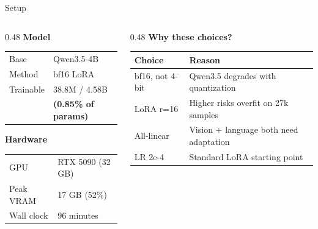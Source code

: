 \documentclass[aspectratio=169, 11pt]{beamer}
\begin{document}
\begin{frame}{Setup}

\begin{columns}[T]
\begin{column}{0.48\textwidth}
    \textbf{Model}\\[0.3em]
    \begin{tabular}{@{}ll@{}}
    Base & Qwen3.5-4B \\
    Method & bf16 LoRA \\
    Trainable & 38.8M / 4.58B \\
    & \textbf{(0.85\% of params)} \\
    \end{tabular}

    \vspace{1em}

    \textbf{Hardware}\\[0.3em]
    \begin{tabular}{@{}ll@{}}
    GPU & RTX 5090 (32 GB) \\
    Peak VRAM & 17 GB (52\%) \\
    Wall clock & 96 minutes \\
    \end{tabular}
\end{column}
\begin{column}{0.48\textwidth}
    \textbf{Why these choices?}\\[0.3em]
    \small
    \begin{tabular}{@{}lp{3.8cm}@{}}
    \toprule
    \textbf{Choice} & \textbf{Reason} \\
    \midrule
    bf16, not 4-bit & Qwen3.5 degrades with quantization \\[0.2em]
    LoRA r=16 & Higher risks overfit on 27k samples \\[0.2em]
    All-linear & Vision + language both need adaptation \\[0.2em]
    LR 2e-4 & Standard LoRA starting point \\
    \bottomrule
    \end{tabular}
\end{column}
\end{columns}

\end{frame}
\end{document}
